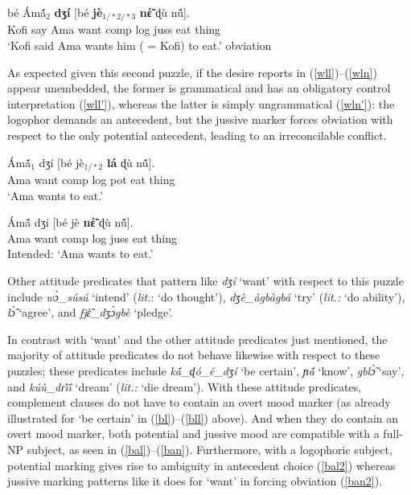 \documentclass[output=paper
,modfonts
,nonflat]{langsci/langscibook}
\newcommand{\Z}{ʒ}
\newcommand{\D}{ɖ}
\newcommand{\ny}{ɲ}
\newcommand{\R}{ɾ}
\newcommand{\á}{\'{ã}}
\newcommand{\É}{\'{\~{ε}}}
\newcommand{\È}{\`{\~{ε}}}
\newcommand{\í}{\'{\~{i}}}
\newcommand{\ì}{\`{\~{i}}}
\newcommand{\Ó}{\'{\~{ɔ}}}
\newcommand{\Ò}{\`{\~{ɔ}}}
\newcommand{\ú}{\'{ũ}}
\newcommand{\ù}{\`{ũ}}
\begin{document}
\ea
{} b\'e  \'Am\'{\~a}$_{2}$ {\bf d{\Z}\'i} [b\'e {\bf j\`e$_{1/*2/*3}$} {\bf n{\É}} {\D}\`u n\'{\~u}].\\
Kofi say Ama want {\sc comp} {\sc log} {\sc juss} eat thing\\
\glt `Kofi said Ama wants him ( = Kofi) to eat.' \label{wln}  \hfill {\sc obviation}
\z


As expected given this second puzzle, if the desire reports in (\ref{wll})--(\ref{wln}) appear unembedded, the former is grammatical and has an obligatory control interpretation (\ref{wll'}), whereas the latter is simply ungrammatical (\ref{wln'}): the logophor demands an antecedent, but the jussive marker forces obviation with respect to the only potential antecedent, leading to an irreconcilable conflict.

\ea
\gll  \'Am\'{\~a}$_{1}$  d{\Z}\'i [b\'e  j\`e$_{1/*2}$ {\bf l\'a} {\D}\`u n\'{\~u}].\\
Ama want {\sc comp} {\sc log} {\sc pot} eat thing\\
\glt `Ama wants to eat.' \label{wll'}  %
\z

\ea
\gll *\'Am\'{\~a} d{\Z}\'i [b\'e  j\`e {\bf n{\É}} {\D}\`u n\'{\~u}].\\
Ama want {\sc comp} {\sc log} {\sc juss} eat thing\\
\glt Intended: `Ama wants to eat.' \label{wln'}  %
\z





 Other attitude predicates that pattern like {\em d{\Z}\'i} `want' with respect to this puzzle include {\em w{\`{ɔ}}\_s\'us\'u} `intend' ({\em lit.}: `do thought'), {\em d{\Z}\`e\_\`agb\`agb\'a} `try' ({\em lit.:} `do ability'), {\em l{\Ò}} `agree', and {\em fj{\È}\_d{\Z}{\`{ɔ}}gb\`e} `pledge'. 

In contrast with `want' and the other attitude predicates just mentioned, the majority of attitude predicates do not behave likewise with respect to these puzzles; these predicates include {\em k\'{\~a}\_{\D}\'o\_\'e\_d{\Z}\'i} `be certain', {\em {\ny}{\á}} `know', {\em gbl{\Ò}} `say', and {\em k\'u\`u\_d{\R}\`{\~i}\'{\~i}} `dream' ({\em lit.:} `die dream'). With these attitude predicates, complement clauses do not have to contain an overt mood marker (as already illustrated for `be certain' in (\ref{bl})--(\ref{bll}) above). And when they do contain an overt mood marker, both potential and jussive mood are compatible with a full-NP subject, as seen in (\ref{bal})--(\ref{ban}). Furthermore, with a logophoric subject, potential marking gives rise to ambiguity in antecedent choice (\ref{bal2}) whereas jussive marking patterns like it does for `want' in forcing obviation (\ref{ban2}).
\end{document}
